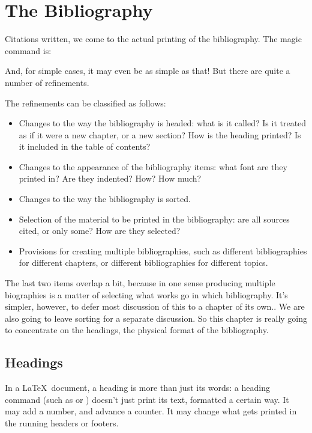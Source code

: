 \chapter{The Bibliography}

Citations written, we come to the actual printing of the
bibliography. The magic command is:
\begin{center}
\end{center}
And, for simple cases, it may even be as simple as that! But there are
quite a number of refinements.

The refinements can be classified as follows:
\begin{itemize}
\item Changes to the way the bibliography is headed: what is it
  called? Is it treated as if it were a new chapter, or a new section?
  How is the heading printed? Is it included in the table of contents?
\item Changes to the appearance of the bibliography items: what font
  are they printed in? Are they indented? How? How much?
\item Changes to the way the bibliography is sorted.
\item Selection of the material to be printed in the bibliography: are
  all sources cited, or only some? How are they selected?
\item Provisions for creating multiple bibliographies, such as
  different bibliographies for different chapters, or different
  bibliographies for different topics.
\end{itemize}
The last two items overlap a bit, because in one sense producing
multiple biographies is a matter of selecting what works go in which
bibliography. It's simpler, however, to defer most discussion of this
to a chapter of its own.. We are
also going to leave sorting for a separate discussion. So this chapter
is really going to concentrate on the headings, the physical format of
the bibliography.

\section{Headings}

In a \LaTeX\ document, a heading is more than just its words: a
heading command (such as  or ) doesn't just
print its text, formatted a certain way. It may add a number, and
advance a counter. It may change what gets printed in the running
headers or footers.

